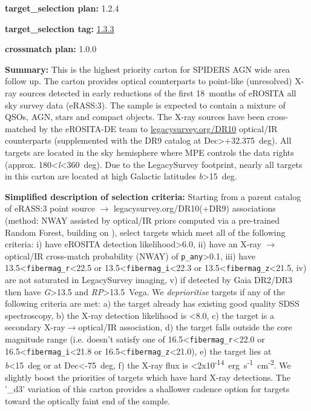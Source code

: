 \noindent\textbf{target\_selection plan:} 1.2.4

\noindent\textbf{target\_selection tag:}
\href{https://github.com/sdss/target_selection/tree/1.3.3/}{1.3.3}

\noindent\textbf{crossmatch plan:} 1.0.0

\noindent\textbf{Summary:} This is the highest priority carton for SPIDERS AGN
wide area follow up. The carton provides optical counterparts to
point-like (unresolved) X-ray sources detected in early reductions of
the first 18~months of eROSITA all sky survey data (eRASS:3). The sample
is expected to contain a mixture of QSOs, AGN, stars and compact
objects. The X-ray sources have been cross-matched by the eROSITA-DE
team to \href{https://www.legacysurvey.org/dr10/}{legacysurvey.org/DR10}
optical/IR counterparts (supplemented with the DR9 catalog at
Dec\textgreater+32.375~deg). All targets are located in the sky
hemisphere where MPE controls the data rights (approx.
180\textless{}\emph{l}\textless360~deg). Due to the LegacySurvey
footprint, nearly all targets in this carton are located at high
Galactic latitudes \textbar{}\emph{b}\textbar\textgreater15~deg.

\noindent\textbf{Simplified description of selection criteria:} Starting from a
parent catalog of eRASS:3 point source $\rightarrow$ legacysurvey.org/DR10(+DR9)
associations (method: NWAY assisted by optical/IR priors computed via a
pre-trained Random Forest, building on
\citealt{Salvato2022}), select targets which meet all of the following criteria:
i) have eROSITA detection likelihood\textgreater6.0, ii) have an X-ray $\rightarrow$
optical/IR cross-match probability (NWAY) of
\texttt{p\_any}\textgreater0.1, iii) have
13.5\textless{}\texttt{fibermag\_r}\textless22.5 or
13.5\textless{}\texttt{fibermag\_i}\textless22.3 or
13.5\textless{}\texttt{fibermag\_z}\textless21.5, iv) are not saturated
in LegacySurvey imaging, v) if detected by Gaia DR2/DR3 then have
\emph{G}\textgreater13.5 and \emph{RP}\textgreater13.5~Vega. We
\emph{deprioritise} targets if any of the following criteria are met: a)
the target already has existing good quality SDSS spectroscopy, b) the
X-ray detection likelihood is \textless8.0, c) the target is a secondary
X-ray$\rightarrow$optical/IR association, d) the target falls outside the core
magnitude range (i.e. doesn't satisfy one of
16.5\textless{}\texttt{fibermag\_r}\textless22.0 or
16.5\textless{}\texttt{fibermag\_i}\textless21.8 or
16.5\textless{}\texttt{fibermag\_z}\textless21.0), e) the target lies at
\textbar{}\emph{b}\textbar\textless15~deg or at Dec\textless-75~deg, f)
the X-ray flux is
\textless2x10\textsuperscript{-14}~erg~s\textsuperscript{-1}~cm\textsuperscript{-2}.
We slightly boost the priorities of targets which have hard X-ray
detections. The '\_d3' variation of this carton provides a shallower
cadence option for targets toward the optically faint end of the sample.


